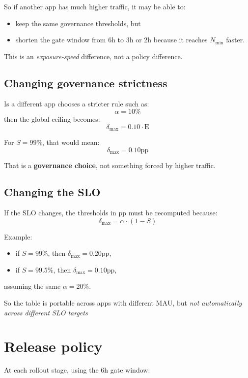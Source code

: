 \documentclass{article}
\newcommand{\MAU}{\mathrm{MAU}}
\newcommand{\E}{\mathrm{E}}
\newcommand{\pp}{\text{pp}}
\begin{document}
So if another app has much higher traffic, it may be able to:
\begin{itemize}[leftmargin=1.4em]
    \item keep the same governance thresholds, but
    \item shorten the gate window from 6h to 3h or 2h because it reaches $N_{\min}$
    faster.
\end{itemize}

This is an \emph{exposure-speed} difference, not a policy difference.

\subsection{Changing governance strictness}

Is a different app chooses a stricter rule such as:
\[
\alpha = 10\%
\]
then the global ceiling becomes:
\[
\delta_{\max} = 0.10 \cdot \E
\]

For $S = 99\%$, that would mean:
\[
\delta_{\max} = 0.10\pp
\]

That is a \textbf{governance choice}, not something forced by higher traffic.

\subsection{Changing the SLO}

If the SLO changes, the thresholds in $\pp$ must be recomputed because:
\[
\delta_{\max} = \alpha \cdot (1 - S)
\]

Example:
\begin{itemize}[leftmargin=1.4em]
    \item if $S = 99\%$, then $\delta_{\max} = 0.20\pp$,
    \item if $S = 99.5\%$, then $\delta_{\max} = 0.10\pp$,
\end{itemize}
assuming the same $\alpha = 20\%$.

So the table is portable across apps with different $\MAU$, but \emph{not automatically across different SLO targets}

\section{Release policy}

At each rollout stage, using the 6h gate window:
\end{document}
